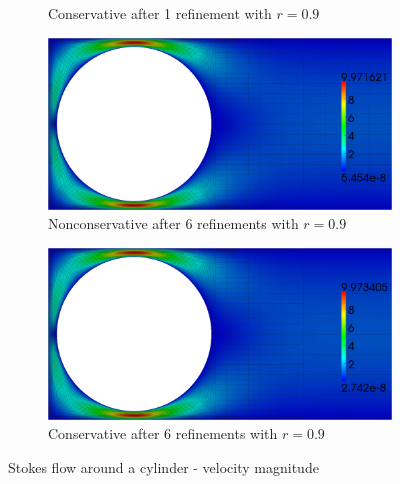 \documentclass[letterpaper]{article}
\begin{document}
\begin{figure}[p]
\begin{subfigure}[t]{0.45\textwidth}
\caption{Conservative after 1 refinement with $r=0.9$}
\label{fig:stokesCylinder9C1}
\end{subfigure}
\begin{subfigure}[t]{0.45\textwidth}
\centering
\includegraphics[width=\textwidth]{figs/StokesCylinder/umag9_NC6.png}
\caption{Nonconservative after 6 refinements with $r=0.9$}
\label{fig:stokesCylinder9NC6}
\end{subfigure}
\begin{subfigure}[t]{0.45\textwidth}
\centering
\includegraphics[width=\textwidth]{figs/StokesCylinder/umag9_C6.png}
\caption{Conservative after 6 refinements with $r=0.9$}
\label{fig:stokesCylinder9C6}
\end{subfigure}
\caption{Stokes flow around a cylinder - velocity magnitude}
\label{fig:stokesCylinder}
\end{figure}
\end{document}
